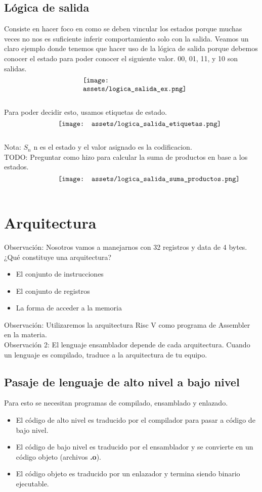 \documentclass[10pt,a4paper]{article}
\begin{document}
\subsection*{Lógica de salida}
Consiste en hacer foco en como se deben vincular los estados porque muchas veces no nos es suficiente inferir comportamiento solo con la salida.
Veamos un claro ejemplo donde tenemos que hacer uso de la lógica de salida porque debemos conocer el estado para poder conocer el siguiente valor. 
00, 01, 11, y 10 son salidas.
\[\begin{minipage}[b]{0.4\textwidth}
    \texttt{[image: assets/logica\_salida\_ex.png]}
    \label{fig:logica_salida_ex}
\end{minipage}\]
Para poder decidir esto, usamos etiquetas de estado.
\[\begin{minipage}[b]{0.6\textwidth}
    \texttt{[image: assets/logica\_salida\_etiquetas.png]}
    \label{fig:logica_salida_etiquetas}
\end{minipage}\]
Nota: \(S_{n}\) n es el estado y el valor asignado es la codificacion. \\
TODO: Preguntar como hizo para calcular la suma de productos en base a los estados.
\[\begin{minipage}[b]{0.6\textwidth}
    \texttt{[image: assets/logica\_salida\_suma\_productos.png]}
    \label{fig:logica_salida_suma_productos}
\end{minipage}\]
\section{Arquitectura}
Observación: Nosotros vamos a manejarnos con 32 registros y data de 4 bytes.\\
¿Qué constituye una arquitectura?
\begin{itemize}
    \item El conjunto de instrucciones
    \item El conjunto de registros
    \item La forma de acceder a la memoria
\end{itemize}
Observación: Utilizaremos la arquitectura Risc V como programa de Assembler en la materia. \\
Observación 2: El lenguaje ensamblador depende de cada arquitectura. Cuando un lenguaje es compilado, traduce a la arquitectura de tu equipo.
\subsection*{Pasaje de lenguaje de alto nivel a bajo nivel}
Para esto se necesitan programas de compilado, ensamblado y enlazado.
\begin{itemize}
    \item El código de alto nivel es traducido por el compilador para pasar a código de bajo nivel.
    \item El código de bajo nivel es traducido por el ensamblador y se convierte en un código objeto (archivos \textbf{.o}).
    \item El código objeto es traducido por un enlazador y termina siendo binario ejecutable.
\end{itemize}
\end{document}
